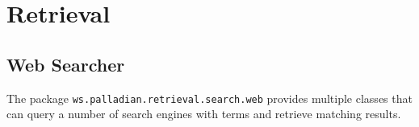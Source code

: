 %
%
%
%
%
%		

\section{Retrieval}

\subsection{Web Searcher}
The package \texttt{ws.palladian.retrieval.search.web} provides multiple classes that can query a number of search engines with terms and retrieve matching results.

